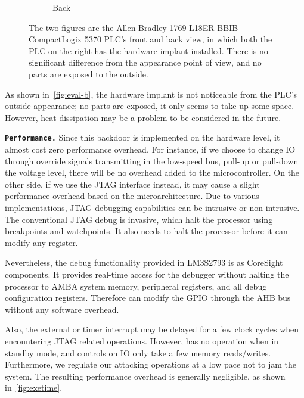 \begin{figure}[h]
\begin{subfigure}[b]{0.22\textwidth}
        \vspace{-0.15in}
	\caption{Back}
		\label{fig:eval-b2}
	\end{subfigure}
    \vspace{-0.05in}
    \caption{The two figures are the Allen Bradley 1769-L18ER-BBIB CompactLogix 5370 PLC's front and back view, in which both the PLC on the right has the hardware implant installed. There is no significant difference from the appearance point of view, and no parts are exposed to the outside.}
		\label{fig:eval-b}
	\vspace{-0.15in}
\end{figure}

As shown in~\autoref{fig:eval-b}, the hardware implant is not noticeable from the PLC's outside appearance; no parts are exposed, it only seems to take up some space. However, heat dissipation may be a problem to be considered in the future.


\texttt{\textbf{Performance.}} Since this backdoor is implemented on the hardware level, it almost cost zero performance overhead. For instance, if we choose to change IO through override signals transmitting in the low-speed bus, pull-up or pull-down the voltage level, there will be no overhead added to the microcontroller. On the other side, if we use the JTAG interface instead, it may cause a slight performance overhead based on the microarchitecture. Due to various implementations, JTAG debugging capabilities can be intrusive or non-intrusive. The conventional JTAG debug is invasive, which halt the processor using breakpoints and watchpoints. It also needs to halt the processor before it can modify any register.

Nevertheless, the debug functionality provided in LM3S2793 is as CoreSight components. It provides real-time access for the debugger without halting the processor to AMBA system memory, peripheral registers, and all debug configuration registers. Therefore \name can modify the GPIO through the AHB bus without any software overhead.

Also, the external or timer interrupt may be delayed for a few clock cycles when encountering JTAG related operations. However, \name has no operation when in standby mode, and controls on IO only take a few memory reads/writes. Furthermore, we regulate our attacking operations at a low pace not to jam the system.  The resulting performance overhead is generally negligible, as shown in~\autoref{fig:exetime}.

